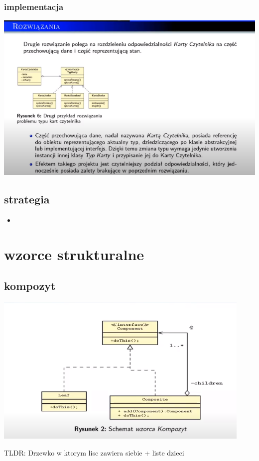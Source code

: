 \documentclass[11pt]{article}
\begin{document}
\subsubsection{implementacja}
\label{sec:orgdbef42e}
\begin{center}
\includegraphics[width=.9\linewidth]{./stan.png}
\end{center}
\subsection{strategia}
\label{sec:orgedad967}
\begin{itemize}
\item 
\end{itemize}
\section{wzorce strukturalne}
\label{sec:org13c94a5}
\subsection{kompozyt}
\label{sec:orgb84edc7}
\begin{center}
\includegraphics[width=.9\linewidth]{./kompozyt.png}
\end{center}
TLDR: Drzewko w ktorym lisc zawiera siebie + liste dzieci
\end{document}
